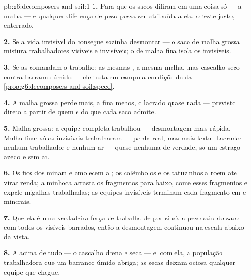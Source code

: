 \begin{solution}{pb:g6:decomposers-and-soil:1}
\textbf{1.} Para que os sacos difiram em uma coisa só --- a malha --- e
qualquer diferença de peso possa ser atribuída a ela: o teste justo,
enterrado.

\textbf{2.} Se a vida invisível do  consegue sozinha desmontar
 --- o saco de malha grossa mistura trabalhadores visíveis e
invisíveis; o de malha fina isola os invisíveis.

\textbf{3.} Se as  comandam o trabalho: as mesmas , a
mesma malha, mas cascalho seco contra barranco úmido --- ele testa em
campo a condição de  da
\cref{prop:g6:decomposers-and-soil:speed}.

\textbf{4.} A malha grossa perde mais, a fina menos, o lacrado quase
nada --- previsto direto a partir de quem e do que cada saco admite.

\textbf{5.} Malha grossa: a equipe completa trabalhou --- desmontagem
mais rápida. Malha fina: só os invisíveis trabalharam --- perda real,
mas mais lenta. Lacrado: nenhum trabalhador e nenhum ar --- quase
nenhuma  de verdade, só um estrago azedo e sem ar.

\textbf{6.} Os fios dos  minam e amolecem a ; os colêmbolos
e os tatuzinhos a roem até virar renda; a minhoca arrasta os
fragmentos para baixo, come esses fragmentos e expele migalhas
trabalhadas; as equipes invisíveis terminam cada fragmento em  e
minerais.

\textbf{7.} Que ela é uma verdadeira força de trabalho de 
por si só: o peso saiu do saco com todos os  visíveis barrados,
então a desmontagem continuou na escala abaixo da vista.

\textbf{8.} A  acima de tudo --- o cascalho drena e seca --- e,
com ela, a população trabalhadora que um barranco úmido abriga; as
 secas deixam ociosa qualquer equipe que chegue.


\end{solution}
